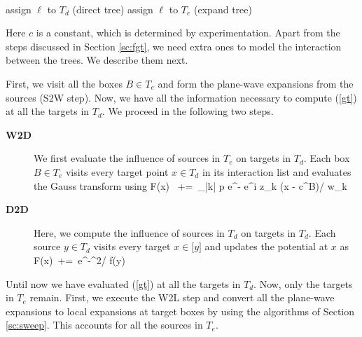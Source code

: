 %


{\tt
\begin{algorithmic}
\STATE
          \STATE assign $\ell$ to $T_d$ (direct tree)
      \ELSE
          \STATE assign $\ell$ to $T_e$ (expand tree)
      \ENDIF
  \ENDFOR
\STATE
\end{algorithmic}
}

Here $c$ is a constant, which is determined by experimentation. Apart from the steps discussed in Section \ref{sc:fgt}, we
 need extra ones to model the interaction between the trees. We describe them next.  

First, we visit all the boxes $B \in T_e$ and form the plane-wave expansions from the sources (S2W step). Now, we have 
all the information necessary to compute (\ref{gt}) at all the targets in $T_d$. We proceed in the following two steps.
\begin{description}
\item[\textbf{W2D}] We first evaluate the influence of sources in $T_e$ on targets in $T_d$. Each box $B \in T_e$ visits
 every target point $x \in T_d$ in its interaction list and evaluates the Gauss transform using
%
\beq F(x) \, +=\, \sum_{|k| \leq p} e^{-} e^{i z_k \cdot (x - c^B)/\sqrt{\delta}} w_k \eeq
%
\item[\textbf{D2D}] Here, we compute the influence of sources in $T_d$ on targets in $T_d$. Each source $y \in T_d$ visits 
every target $x \in \mathcal[y]$ and updates the potential at $x$ as 
%  
\beq F(x) \,+=\, e^{-^2/\sqrt{\delta}} f(y) \eeq
%
\end{description}
%
Until now we have evaluated (\ref{gt}) at all the targets in $T_d$. Now, only the targets in $T_e$ remain. First, we execute
 the W2L step and convert all the plane-wave expansions to local expansions at target boxes by using the algorithms of 
 Section \ref{sc:sweep}. This accounts for all the sources in $T_e$. 

